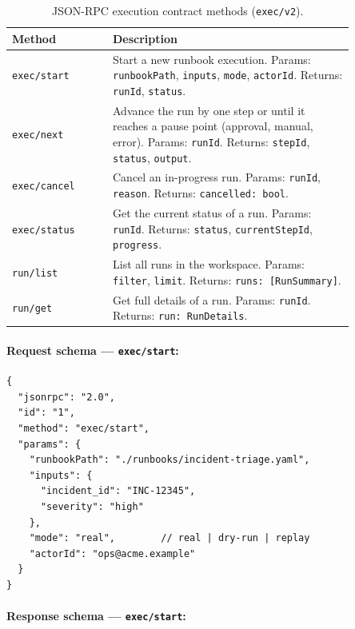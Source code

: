 \begin{table}[ht]
\centering
\begin{tabular}{p{0.25\linewidth}p{0.60\linewidth}}
\hline
\textbf{Method} & \textbf{Description} \\
\hline
\texttt{exec/start} &
Start a new runbook execution.  Params: \texttt{runbookPath}, \texttt{inputs},
\texttt{mode}, \texttt{actorId}.  Returns: \texttt{runId}, \texttt{status}. \\
\hline
\texttt{exec/next} &
Advance the run by one step or until it reaches a pause point (approval,
manual, error).  Params: \texttt{runId}.  Returns: \texttt{stepId},
\texttt{status}, \texttt{output}. \\
\hline
\texttt{exec/cancel} &
Cancel an in-progress run.  Params: \texttt{runId}, \texttt{reason}.  Returns:
\texttt{cancelled: bool}. \\
\hline
\texttt{exec/status} &
Get the current status of a run.  Params: \texttt{runId}.  Returns:
\texttt{status}, \texttt{currentStepId}, \texttt{progress}. \\
\hline
\texttt{run/list} &
List all runs in the workspace.  Params: \texttt{filter}, \texttt{limit}.
Returns: \texttt{runs: [RunSummary]}. \\
\hline
\texttt{run/get} &
Get full details of a run.  Params: \texttt{runId}.  Returns: \texttt{run:
RunDetails}. \\
\hline
\end{tabular}
\caption{JSON-RPC execution contract methods (\texttt{exec/v2}).}
\label{tab:exec-methods}
\end{table}

\paragraph{Request schema — \texttt{exec/start}:}

\begin{verbatim}
{
  "jsonrpc": "2.0",
  "id": "1",
  "method": "exec/start",
  "params": {
    "runbookPath": "./runbooks/incident-triage.yaml",
    "inputs": {
      "incident_id": "INC-12345",
      "severity": "high"
    },
    "mode": "real",        // real | dry-run | replay
    "actorId": "ops@acme.example"
  }
}
\end{verbatim}

\paragraph{Response schema — \texttt{exec/start}:}

